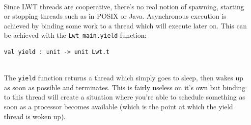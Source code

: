 \documentclass[12pt,twoside,notitlepage]{report}
\begin{document}
\hfill\\
Since LWT threads are cooperative, there's no real notion of spawning, starting or stopping threads such as in POSIX or Java. Asynchronous execution is achieved by binding some work to a thread which will execute later on. This can be
achieved with the {\tt Lwt\_main.yield} function:
\hfill\\
\begin{lstlisting}
val yield : unit -> unit Lwt.t
\end{lstlisting}
\hfill\\
The {\tt yield} function returns a thread which simply goes to sleep, then wakes up as soon as possible and terminates. This is fairly useless on it's own but binding to this thread will create a situation where you're able to
schedule something as soon as a processor becomes available (which is the point at which the yield thread is woken up).
\end{document}
